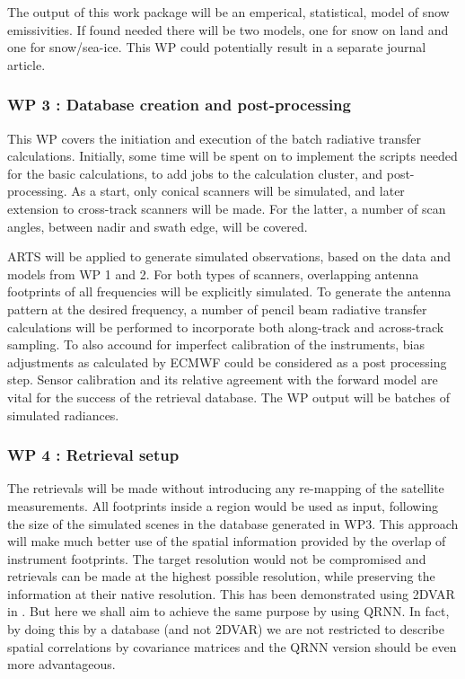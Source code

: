 \documentclass[12pt,oneside,a4paper]{article}
\begin{document}
The output of this work package will be an emperical, statistical, model of
snow emissivities. If found needed there will be two models, one for snow on
land and one for snow/sea-ice. This WP could potentially result in a separate
journal article.
\vspace{-1.0ex}

\subsubsection*{WP 3 : Database creation and post-processing}
%
\label{sec:database}	
This WP covers the initiation and execution of the batch radiative
transfer calculations. Initially, some time will be spent on to implement the
scripts needed for the basic calculations, to add jobs to the calculation
cluster, and post-processing. As a start, only conical scanners will be
simulated, and later extension to cross-track scanners will be made. For the
latter, a number of scan angles, between nadir and swath edge, will be covered.

ARTS will be applied to generate simulated observations, based on the data and
models from WP 1 and 2. For both types of scanners, overlapping antenna
footprints of all frequencies will be explicitly simulated. To generate the
antenna pattern at the desired frequency, a number of pencil beam radiative
transfer calculations will be performed to incorporate both along-track and
across-track sampling. To also accound for imperfect calibration of the
instruments, bias adjustments as calculated by ECMWF could be considered as a
post processing step. Sensor calibration and its relative agreement with the
forward model are vital for the success of the retrieval database. The WP
output will be batches of simulated radiances. \vspace{-1.0ex}


\subsubsection*{WP 4 : Retrieval setup}
%
\label{sec:setup}
The retrievals will be made without introducing any re-mapping of the satellite
measurements. All footprints inside a region would be used as input, following
the size of the simulated scenes in the database generated in WP3. This
approach will make much better use of the spatial information provided by the
overlap of instrument footprints. The target resolution would not be
compromised and retrievals can be made at the highest possible resolution,
while preserving the information at their native resolution. This has been
demonstrated using 2DVAR in \citet{duncan:anexp:19}. But here we shall aim to
achieve the same purpose by using QRNN. In fact, by doing this by a database
(and not 2DVAR) we are not restricted to describe spatial correlations by
covariance matrices and the QRNN version should be even more advantageous.
\end{document}
